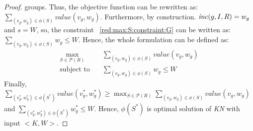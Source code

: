 \begin{proof}
    groups. Thus, the objective function can be rewritten as:
    $\sum_{(v_g,w_g) \in \phi(S)} \mathit{value}(v_g,w_g)$.
    Furthermore, by construction. $\mathit{inc}(g,I,R) = w_g$ and $s = W$, so, the constraint 
    ~\ref{red:max:S:constraint:G} can be written as: 
    $\sum_{(v_g,w_g) \in \phi(S)} w_g \le W$.
    Hence, the whole formulation can be defined as:
    \begin{align}
        \label{red:max:Z:f}
        \max_{S \in \mathcal{P}(R)} & \sum_{(v_g,w_g) \in \phi(S)} \mathit{value}(v_g,w_g)\\
        \label{red:max:Z:constraint:G}
        \text{subject to} \quad & \sum_{(v_g,w_g) \in \phi(S)} w_g \le W
    \end{align}
    Finally, $\sum_{(v_g^*,w_g^*) \in \phi(S^*)} \mathit{value}(v_g^*,w_g^*)  \ge \max_{S \in \mathcal{P}(R)}  
    \sum_{(v_g,w_g) \in \phi(S)} \mathit{value}(v_g,w_g)$\\
    and $\sum_{(v_g^*,w_g^*) \in \phi(S^*)} w_g^* \le W$.
    Hence, $\phi(S^*)$ is optimal solution of \textit{KN} with input $<K,W>$.
\end{proof}
